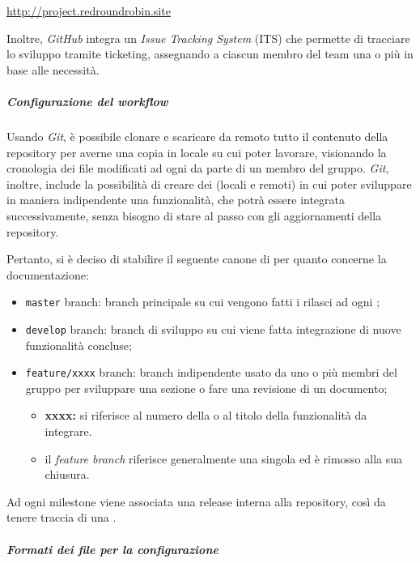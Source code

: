 		\href{http://project.redroundrobin.site}{http://project.redroundrobin.site}

		Inoltre, \textit{GitHub} integra un \textit{Issue Tracking System} (ITS) che permette di tracciare lo sviluppo tramite ticketing, assegnando a ciascun membro del team una o più  in base alle necessità.

		\subparagraph{Configurazione del workflow}

		Usando \textit{Git}, è possibile clonare e scaricare da remoto tutto il contenuto della repository per averne una copia in locale su cui poter lavorare, visionando la cronologia dei file modificati ad ogni  da parte di un membro del gruppo.
		\textit{Git}, inoltre, include la possibilità di creare dei  (locali e remoti) in cui poter sviluppare in maniera indipendente una funzionalità, che potrà essere integrata successivamente, senza bisogno di stare al passo con gli aggiornamenti della repository.

		Pertanto, si è deciso di stabilire il seguente canone di  per quanto concerne la documentazione:
		\begin{itemize}
			\item \verb!master! branch: branch principale su cui vengono fatti i rilasci ad ogni ;
			\item \verb!develop! branch: branch di sviluppo su cui viene fatta integrazione di nuove funzionalità concluse;
			\item \verb!feature/xxxx! branch: branch indipendente usato da uno o più membri del gruppo per sviluppare una sezione o fare una revisione di un documento;
			\begin{itemize}
				\item \textbf{xxxx:} si riferisce al numero della  o al titolo della funzionalità da integrare.
				\item il \textit{feature branch} riferisce generalmente una singola  ed è rimosso alla sua chiusura.
			\end{itemize}
		\end{itemize}

		Ad ogni milestone viene associata una release interna alla repository, così da tenere traccia di una .

		\subparagraph{Formati dei file per la configurazione}


